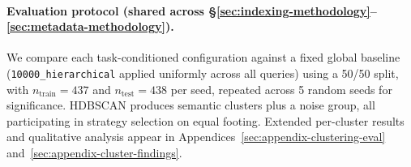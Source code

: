 

\paragraph{Evaluation protocol (shared across §\ref{sec:indexing-methodology}--\ref{sec:metadata-methodology}).}
We compare each task-conditioned configuration against a fixed global baseline (\texttt{10000\_hierarchical} applied uniformly across all queries) using a 50/50 split, with $n_{\text{train}}{=}437$ and $n_{\text{test}}{=}438$ per seed, repeated across 5 random seeds for significance.
HDBSCAN produces semantic clusters plus a noise group, all participating in strategy selection on equal footing. Extended per-cluster results and qualitative analysis appear in Appendices~\ref{sec:appendix-clustering-eval} and~\ref{sec:appendix-cluster-findings}.

